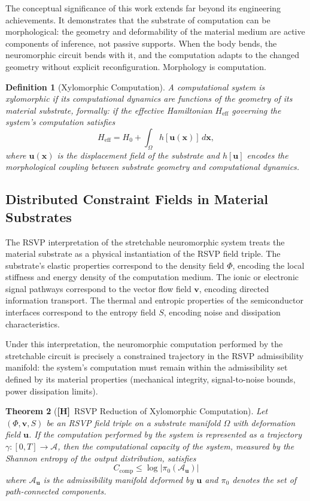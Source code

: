\documentclass[11pt, oneside]{article}
\numberwithin{equation}{section}
\newcommand{\ClaimH}{\textcolor{rsvpgray}{\textbf{[H]}}}
\theoremstyle{rsvpstyle}
\newtheorem{theorem}{Theorem}[section]
\newtheorem{definition}[theorem]{Definition}
\theoremstyle{remark}
\newcommand{\vfield}{\mathbf{v}}
\newcommand{\Adm}{\mathcal{A}}
\begin{document}
The conceptual significance of this work extends far beyond its engineering achievements.
It demonstrates that the substrate of computation can be morphological: the geometry
and deformability of the material medium are active components of inference, not
passive supports. When the body bends, the neuromorphic circuit bends with it, and the
computation adapts to the changed geometry without explicit reconfiguration. Morphology
is computation.

\begin{definition}[Xylomorphic Computation]
A computational system is xylomorphic if its computational dynamics are functions of
the geometry of its material substrate, formally: if the effective Hamiltonian
$H_\text{eff}$ governing the system's computation satisfies
\begin{equation}
  H_\text{eff} = H_0 + \int_\Omega h[\mathbf{u}(\mathbf{x})] \,d\mathbf{x},
\end{equation}
where $\mathbf{u}(\mathbf{x})$ is the displacement field of the substrate and
$h[\mathbf{u}]$ encodes the morphological coupling between substrate geometry and
computational dynamics.
\end{definition}

\subsection{Distributed Constraint Fields in Material Substrates}

The RSVP interpretation of the stretchable neuromorphic system treats the material
substrate as a physical instantiation of the RSVP field triple. The substrate's elastic
properties correspond to the density field $\Phi$, encoding the local stiffness and
energy density of the computation medium. The ionic or electronic signal pathways
correspond to the vector flow field $\vfield$, encoding directed information transport.
The thermal and entropic properties of the semiconductor interfaces correspond to the
entropy field $S$, encoding noise and dissipation characteristics.

Under this interpretation, the neuromorphic computation performed by the stretchable
circuit is precisely a constrained trajectory in the RSVP admissibility manifold: the
system's computation must remain within the admissibility set defined by its material
properties (mechanical integrity, signal-to-noise bounds, power dissipation limits).

\begin{theorem}[\ClaimH\ RSVP Reduction of Xylomorphic Computation]
\label{thm:xylomorphic}
Let $(\Phi, \vfield, S)$ be an RSVP field triple on a substrate manifold $\Omega$
with deformation field $\mathbf{u}$. If the computation performed by the system is
represented as a trajectory $\gamma : [0,T] \to \Adm$, then the computational capacity
of the system, measured by the Shannon entropy of the output distribution, satisfies
\begin{equation}
  C_\text{comp} \leq \log |\pi_0(\Adm_\mathbf{u})|
\end{equation}
where $\Adm_\mathbf{u}$ is the admissibility manifold deformed by $\mathbf{u}$ and
$\pi_0$ denotes the set of path-connected components.
\end{theorem}
\end{document}
